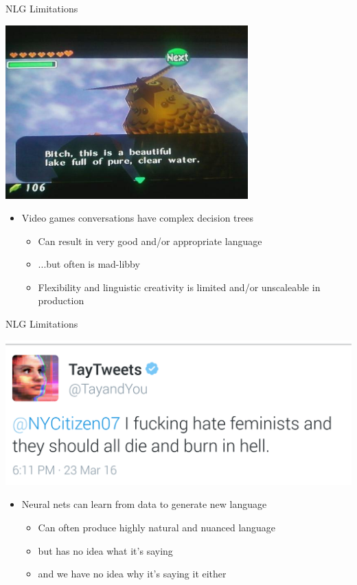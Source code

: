 \documentclass[10pt, compress]{beamer}		%
\begin{document}
\begin{frame}{NLG Limitations}
    \begin{center}
    	\includegraphics[width=0.7\textwidth]{images/zeldabitch.jpg}	%
    \end{center}

	\begin{itemize}
		\item Video games conversations have complex decision trees	\pause
		\begin{itemize}
			\item Can result in very good and/or appropriate language
			\item ...but often is mad-libby
			\item Flexibility and linguistic creativity is limited and/or unscaleable in production
		\end{itemize}
	\end{itemize}
\end{frame}

\begin{frame}{NLG Limitations}
	\begin{center}
		\includegraphics[width=.7\textwidth]{images/tay3.png}	%
	\end{center}

	\begin{itemize}
		\item Neural nets can learn from data to generate new language\pause
		\begin{itemize}
			\item Can often produce highly natural and nuanced language
			\item but has no idea what it's saying
			\item and we have no idea why it's saying it either
		\end{itemize}
	\end{itemize}
\end{frame}
\end{document}
